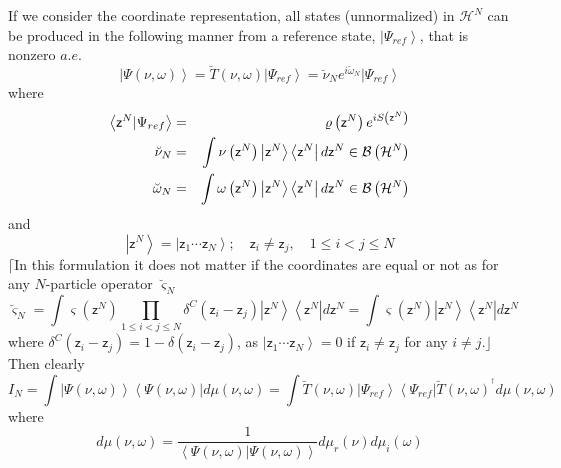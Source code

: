 \documentclass[aps,preprint]{revtex4}
\begin{document}
If we consider the coordinate representation, all states (unnormalized) in $%
\mathcal{H}^{N}$ can be produced in the following manner from a reference
state, $\left\vert \Psi _{ref}\right\rangle $, that is nonzero $a.e.$ 
\begin{equation}
\left\vert \Psi \left( \nu ,\omega \right) \right\rangle =\breve{T}\left(
\nu ,\omega \right) \left\vert \Psi _{ref}\right\rangle =\breve{\nu}_{N}e^{i%
\breve{\omega}_{N}}\left\vert \Psi _{ref}\right\rangle
\end{equation}%
where 
\begin{eqnarray}
\left\langle \mathsf{z}^{N}|\Psi _{ref}\right\rangle &=&\varrho \left( 
\mathsf{z}^{N}\right) e^{iS\left( \mathsf{z}^{N}\right) }  \notag \\
\breve{\nu}_{N} &=&\int \nu \left( \mathsf{z}^{N}\right) \left\vert \mathsf{z%
}^{N}\right\rangle \left\langle \mathsf{z}^{N}\right\vert d\mathsf{z}^{N}\in 
\mathcal{B}\left( \mathcal{H}^{N}\right) \\
\breve{\omega}_{N} &=&\int \omega \left( \mathsf{z}^{N}\right) \left\vert 
\mathsf{z}^{N}\right\rangle \left\langle \mathsf{z}^{N}\right\vert d\mathsf{z%
}^{N}\in \mathcal{B}\left( \mathcal{H}^{N}\right)
\end{eqnarray}%
and 
\begin{equation}
\left\vert \mathsf{z}^{N}\right\rangle =\left\vert \mathsf{z}_{1}\cdots 
\mathsf{z}_{N}\right\rangle ;\quad \mathsf{z}_{i}\neq \mathsf{z}_{j},\quad
1\leq i<j\leq N
\end{equation}%
$\lceil $In this formulation it does not matter if the coordinates are equal
or not as for any $N$-particle operator $\breve{\varsigma}_{N}$ 
\begin{equation}
\breve{\varsigma}_{N}=\int \varsigma \left( \mathsf{z}^{N}\right)
\prod_{1\leq i<j\leq N}\delta ^{C}\left( \mathsf{z}_{i}-\mathsf{z}%
_{j}\right) \left\vert \mathsf{z}^{N}\right\rangle \left\langle \mathsf{z}%
^{N}\right\vert d\mathsf{z}^{N}=\int \varsigma \left( \mathsf{z}^{N}\right)
\left\vert \mathsf{z}^{N}\right\rangle \left\langle \mathsf{z}%
^{N}\right\vert d\mathsf{z}^{N}
\end{equation}%
where $\delta ^{C}\left( \mathsf{z}_{i}-\mathsf{z}_{j}\right) =1-\delta
\left( \mathsf{z}_{i}-\mathsf{z}_{j}\right) $, as $\left\vert \mathsf{z}%
_{1}\cdots \mathsf{z}_{N}\right\rangle =0$ if $\mathsf{z}_{i}\neq \mathsf{z}%
_{j}$ for any $i\neq j$.$\rfloor $ Then clearly 
\begin{equation}
I_{N}=\int \left\vert \Psi \left( \nu ,\omega \right) \right\rangle
\left\langle \Psi \left( \nu ,\omega \right) \right\vert d\mu \left( \nu
,\omega \right) =\int \breve{T}\left( \nu ,\omega \right) \left\vert \Psi
_{ref}\right\rangle \left\langle \Psi _{ref}\right\vert \breve{T}\left( \nu
,\omega \right) ^{^{\dagger }}d\mu \left( \nu ,\omega \right)
\end{equation}%
where 
\begin{equation}
d\mu \left( \nu ,\omega \right) =\frac{1}{\left\langle \Psi \left( \nu
,\omega \right) |\Psi \left( \nu ,\omega \right) \right\rangle }d\mu
_{r}\left( \nu \right) d\mu _{i}\left( \omega \right)
\end{equation}%
\qquad \qquad
\end{document}
